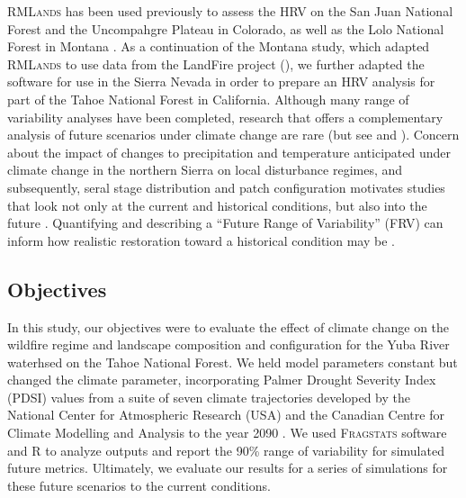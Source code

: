 \documentclass[12pt]{article}
\begin{document}
\begin{spacing}{1}
\textsc{RMLands} has been used previously to assess the HRV on the San Juan National Forest \citep{Mcgarigal2012} and the Uncompahgre Plateau \citep{Romme2009} in Colorado, as well as the Lolo National Forest in Montana \citep{Cushman2011}. As a continuation of the Montana study, which adapted \textsc{RMLands} to use data from the LandFire project (), we further adapted the software for use in the Sierra Nevada in order to prepare an HRV analysis for part of the Tahoe National Forest in California. Although many range of variability analyses have been completed, research that offers a complementary analysis of future scenarios under climate change are rare (but see \cite{Keane2008} and \cite{Duveneck2014}). Concern about the impact of changes to precipitation and temperature anticipated under climate change in the northern Sierra on local disturbance regimes, and subsequently, seral stage distribution and patch configuration motivates studies that look not only at the current and historical conditions, but also into the future \citep{Fule2008,North2012}. Quantifying and describing a ``Future Range of Variability'' (FRV) can inform how realistic restoration toward a historical condition may be \citep{Duncan2010}.

\subsection{Objectives}
In this study, our objectives were to evaluate the effect of climate change on the wildfire regime and landscape composition and configuration for the Yuba River waterhsed on the Tahoe National Forest. We held model parameters constant but changed the climate parameter, incorporating Palmer Drought Severity Index (PDSI) values from a suite of seven climate trajectories developed by the National Center for Atmospheric Research (USA) and the Canadian Centre for Climate Modelling and Analysis to the year 2090 \citep{Cook2014}. We used \textsc{Fragstats} software and R to analyze outputs and report the 90\% range of variability for simulated future metrics. Ultimately, we evaluate our results for a series of simulations for these future scenarios to the current conditions. 


















\end{spacing}
\end{document}
